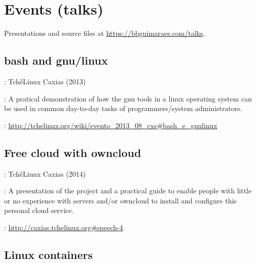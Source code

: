 \section*{Events (talks)}

Presentations and source files at \url{https://bbguimaraes.com/talks}.

\subsection*{bash and gnu/linux}

\begin{description}[noitemsep]
    \item[Event]: TchêLinux Caxias (2013)
    \item[Summary]:
        A pratical demonstration of how the gnu tools in a linux operating
        system can be used in common day-to-day tasks of programmers/system
        administrators.
    \item[Website]:
        \url{http://tchelinux.org/wiki/evento_2013_08_cxs#bash_e_gnulinux}
\end{description}

\subsection*{Free cloud with owncloud}

\begin{description}[noitemsep]
    \item[Event]: TchêLinux Caxias (2014)
    \item[Summary]:
        A presentation of the project and a practical guide to enable people
        with little or no experience with servers and/or owncloud to install
        and configure this personal cloud service.
    \item[Website]: \url{http://caxias.tchelinux.org#speech-4}
\end{description}

\subsection*{Linux containers}

